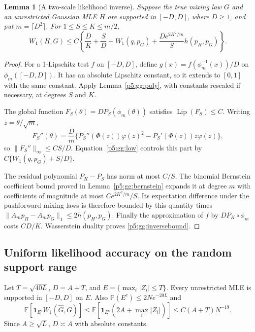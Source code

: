 \documentclass[11pt,a4paper]{article}
\newtheorem{lemma}[theorem]{Lemma}
\theoremstyle{definition}
\theoremstyle{remark}
\numberwithin{equation}{section}
\begin{document}
\begin{lemma}[A two-scale likelihood inverse]\label{p5:gg:inverse}
Suppose the true mixing law $G$ and an unrestricted Gaussian MLE
$H$ are supported in $[-D,D]$, where $D\ge1$, and put
$m=\lceil D^2\rceil$.  For $1\le S\le K\le m/2$,
\begin{equation}\label{p5:gg:inversebound}
 W_1(H,G)\le C\left\{\frac D K+\frac S D+W_1(q,p_G)
                +\frac{D e^{2K^2/m}}S h(p_H,p_G)\right\}.
\end{equation}
\end{lemma}
\begin{proof}
For a 1-Lipschitz test $f$ on $[-D,D]$, define
$g(x)=f(\phi_m^{-1}(x))/D$ on $\phi_m([-D,D])$.
It has an absolute Lipschitz constant, so it extends to $[0,1]$
with the same constant.  Apply Lemma~\ref{p5:gg:poly}, with constants
rescaled if necessary, at degrees $S$ and $K$.

The global function $F_S(\theta)=D P_S(\phi_m(\theta))$ satisfies
$\operatorname{Lip}(F_S)\le C$.  Writing $z=\theta/\sqrt m$,
\[
 F_S''(\theta)=\frac Dm
 \{P_S''(\Phi(z))\varphi(z)^2
                       -P_S'(\Phi(z))z\varphi(z)\},
\]
so $\|F_S''\|_\infty\le CS/D$.  Equation~\eqref{p5:gg:low}
controls this part by $C\{W_1(q,p_G)+S/D\}$.

The residual polynomial $P_K-P_S$ has norm at most $C/S$.
The binomial Bernstein coefficient bound proved in
Lemma~\ref{p5:gg:bernstein} expands it at degree $m$ with coefficients
of magnitude at most $Ce^{2K^2/m}/S$.
Its expectation difference under the pushforward mixing laws is
therefore bounded by this quantity times
$\|A_mp_H-A_mp_G\|_1\le2h(p_H,p_G)$.
Finally the approximation of $f$ by $DP_K\circ\phi_m$ costs
$CD/K$.  Wasserstein duality proves \eqref{p5:gg:inversebound}.
\end{proof}

\subsection{Uniform likelihood accuracy on the random support range}

Let $T=\sqrt{40L}$, $D=A+T$, and
$E=\{\max_i|Z_i|\le T\}$.  Every unrestricted MLE is supported
in $[-D,D]$ on $E$.  Also $\mathbb P(E^c)\le2Ne^{-20L}$ and
\begin{equation}\label{p5:gg:failure}
 \mathbb E[\mathbf1_{E^c}W_1(\widehat G,G)]
 \le\mathbb E[\mathbf1_{E^c}(2A+\max_i|Z_i|)]
 \le C(A+T)N^{-19}.
\end{equation}
Since $A\ge\sqrt L$, $D\asymp A$ with absolute constants.
\end{document}

